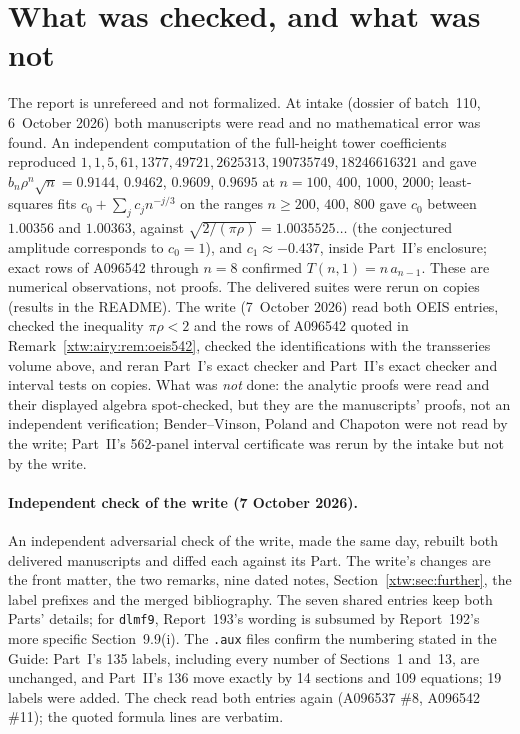 \documentclass[11pt]{article}
\theoremstyle{remark}\newtheorem{remark}[theorem]{Remark}
\begin{document}
\section*{What was checked, and what was not}\label{xtw:sec:trust}
The report is unrefereed and not formalized. At intake (dossier of batch~110,
6~October 2026) both manuscripts were read and no mathematical error was
found. An independent computation of the full-height tower coefficients
reproduced $1,1,5,61,1377,49721,2625313,190735749,18246616321$ and gave
$b_n\rho^n\sqrt n=0.9144$, $0.9462$, $0.9609$, $0.9695$ at $n=100$, $400$,
$1000$, $2000$; least-squares fits $c_0+\sum_jc_jn^{-j/3}$ on the ranges
$n\ge200$, $400$, $800$ gave $c_0$ between $1.00356$ and $1.00363$, against
$\sqrt{2/(\pi\rho)}=1.0035525\ldots$ (the conjectured amplitude corresponds to
$c_0=1$), and $c_1\approx-0.437$, inside Part~II's enclosure; exact rows of
A096542 through $n=8$ confirmed $T(n,1)=n\,a_{n-1}$. These are numerical
observations, not proofs. The delivered suites were rerun on copies (results
in the README). The write (7~October 2026) read both OEIS entries, checked the
inequality $\pi\rho<2$ and the rows of A096542 quoted in
Remark~\ref{xtw:airy:rem:oeis542}, checked the identifications with the
transseries volume above, and reran Part~I's exact checker and Part~II's exact
checker and interval tests on copies. What was \emph{not} done: the analytic
proofs were read and their displayed algebra spot-checked, but they are the
manuscripts' proofs, not an independent verification; Bender--Vinson, Poland
and Chapoton were not read by the write; Part~II's 562-panel interval
certificate was rerun by the intake but not by the write.

\paragraph{Independent check of the write (7 October 2026).} An independent
adversarial check of the write, made the same day, rebuilt both delivered
manuscripts and diffed each against its Part. The write's changes are the
front matter, the two remarks, nine dated notes, Section~\ref{xtw:sec:further},
the label prefixes and the merged bibliography. The seven shared entries keep
both Parts' details; for \texttt{dlmf9}, Report~193's wording is subsumed by
Report~192's more specific Section~9.9(i). The \texttt{.aux} files confirm the
numbering stated in the Guide: Part~I's 135 labels, including every number
of Sections~1 and~13, are unchanged, and Part~II's 136 move exactly by 14
sections and 109 equations; 19 labels were added. The check read both
entries again (A096537 \#8, A096542 \#11); the quoted formula lines are
verbatim.
\end{document}
